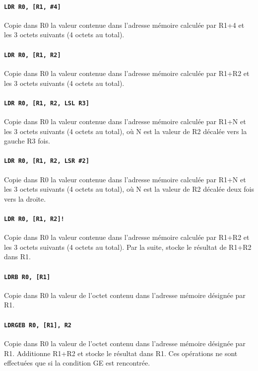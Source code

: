 \documentclass{tufte-handout}
\begin{document}
\paragraph{\texttt{LDR R0, [R1, \#4]}} Copie dans R0 la valeur contenue dans l'adresse mémoire calculée par R1+4 et les 3 octets suivants (4 octets au total).

\paragraph{\texttt{LDR R0, [R1, R2]}} Copie dans R0 la valeur contenue dans l'adresse mémoire calculée par R1+R2 et les 3 octets suivants (4 octets au total).

\paragraph{\texttt{LDR R0, [R1, R2, LSL R3]}} Copie dans R0 la valeur contenue dans l'adresse mémoire calculée par R1+N et les 3 octets suivants (4 octets au total), où N est la valeur de R2 décalée vers la gauche R3 fois.

\paragraph{\texttt{LDR R0, [R1, R2, LSR \#2]}} Copie dans R0 la valeur contenue dans l'adresse mémoire calculée par R1+N et les 3 octets suivants (4 octets au total), où N est la valeur de R2 décalée deux fois vers la droite.

\paragraph{\texttt{LDR R0, [R1, R2]!}} Copie dans R0 la valeur contenue dans l'adresse mémoire calculée par R1+R2 et les 3 octets suivants (4 octets au total). Par la suite, stocke le résultat de R1+R2 dans R1.

\paragraph{\texttt{LDRB R0, [R1]}} Copie dans R0 la valeur de l'octet contenu dans l'adresse mémoire désignée par R1.

\paragraph{\texttt{LDRGEB R0, [R1], R2}} Copie dans R0 la valeur de l'octet contenu dans l'adresse mémoire désignée par R1. Additionne R1+R2 et stocke le résultat dans R1. Ces opérations ne sont effectuées que si la condition GE est rencontrée.
\end{document}
